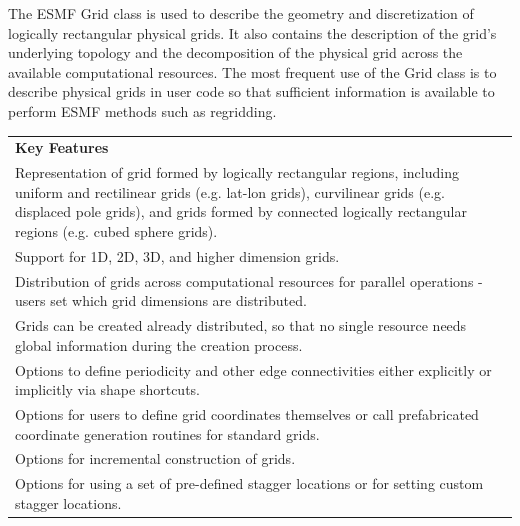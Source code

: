 %

The ESMF Grid class is used to describe the geometry and discretization
of logically rectangular physical grids.  It also contains the
description of the grid's underlying topology and the decomposition
of the physical grid
across the available computational resources.  The most frequent 
use of the Grid class is to describe physical grids in user
code so that sufficient information is available to perform ESMF
methods such as regridding.  

\begin{center}
\begin{tabular}{|p{6in}|}
\hline
\vspace{.01in}
{\bf Key Features} \\[.01in]
Representation of grid formed by logically rectangular regions,
including uniform and rectilinear grids (e.g. lat-lon grids),
curvilinear grids (e.g. displaced pole grids), and grids formed
by connected logically rectangular regions (e.g. cubed sphere grids).\\
Support for 1D, 2D, 3D, and higher dimension grids.\\ 
Distribution of grids across computational resources for parallel
operations - users set which grid dimensions are distributed.\\
Grids can be created already distributed, so that no single
resource needs global information during the creation process.\\
Options to define periodicity and other edge connectivities either 
explicitly or implicitly via shape shortcuts.\\ 
Options for users to define grid coordinates themselves or call
prefabricated coordinate generation routines for standard grids.\\
Options for incremental construction of grids.\\
Options for using a set of pre-defined stagger locations or for setting
custom stagger locations.\\ [.03in] \hline
\end{tabular}
\end{center}

